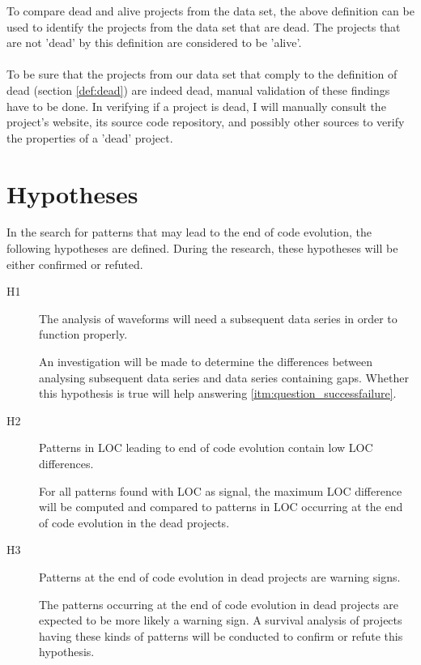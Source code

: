 To compare dead and alive projects from the data set, the above definition can
be used to identify the projects from the data set that are dead. The projects
that are not 'dead' by this definition are considered to be 'alive'.

\paragraph{}
To be sure that the projects from our data set that comply to the definition of
dead (section \ref{def:dead}) are indeed dead, manual validation of these
findings have to be done.
In verifying if a project is dead, I will manually consult the project's
website, its source code repository, and possibly other sources to verify the
properties of a 'dead' project.

\section{Hypotheses}
In the search for patterns that may lead to the end of code evolution, the
following hypotheses are defined. During the research, these hypotheses will be
either confirmed or refuted.

\begin{description}
	\item[H1\label{hyp:subsequent_data}] \hspace{0em}
	The analysis of waveforms will need a subsequent data series in order
	to function properly.

	An investigation will be made to determine the differences between analysing
	subsequent data series and data series containing gaps. Whether this
	hypothesis is true will help answering \ref{itm:question_successfailure}.

	\item[H2\label{hyp:pattern_low_diff}] \hspace{0em}
	Patterns in LOC leading to end of code evolution contain low LOC differences.

	For all patterns found with LOC as signal, the maximum LOC difference will be
	computed and compared to patterns in LOC occurring at the end of code
	evolution in the dead projects.
	
	\item[H3\label{hyp:pattern_types}] \hspace{0em}
	Patterns at the end of code evolution in dead projects are warning signs.

	The patterns occurring at the end of code evolution in dead projects are
	expected to be more likely a warning sign. A survival analysis of projects
	having these kinds of patterns will be conducted to confirm or refute this
	hypothesis.
\end{description}

